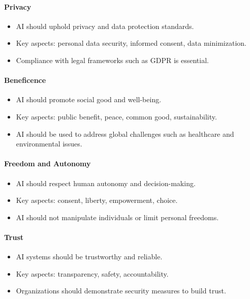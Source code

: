 \paragraph{Privacy}
\begin{itemize}
    \item AI should uphold privacy and data protection standards.
    \item Key aspects: personal data security, informed consent, data minimization.
    \item Compliance with legal frameworks such as GDPR is essential.
\end{itemize}

\paragraph{Beneficence}
\begin{itemize}
    \item AI should promote social good and well-being.
    \item Key aspects: public benefit, peace, common good, sustainability.
    \item AI should be used to address global challenges such as healthcare and environmental issues.
\end{itemize}

\paragraph{Freedom and Autonomy}
\begin{itemize}
    \item AI should respect human autonomy and decision-making.
    \item Key aspects: consent, liberty, empowerment, choice.
    \item AI should not manipulate individuals or limit personal freedoms.
\end{itemize}

\paragraph{Trust}
\begin{itemize}
    \item AI systems should be trustworthy and reliable.
    \item Key aspects: transparency, safety, accountability.
    \item Organizations should demonstrate security measures to build trust.
\end{itemize}

